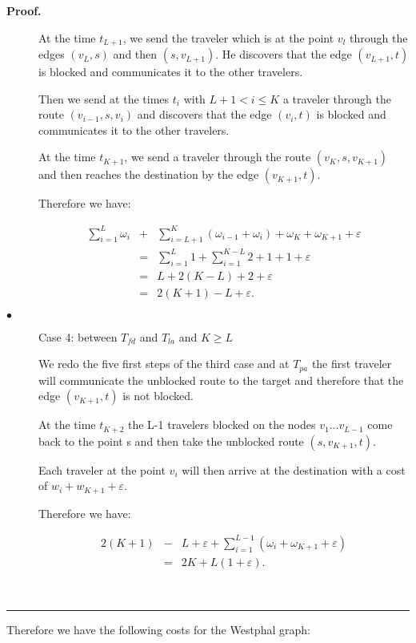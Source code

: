 \documentclass[a4paper, 10pt]{article}
\newenvironment{proof}[1][Proof]{\textbf{#1.} }{\ \rule{0.5em}{0.5em}}
\begin{document}
\begin{proof}
\begin{description}
At the time $t_{L+1}$, we send the traveler which is at the point $v_l$ through the edges $(v_{L},s)$ and then $(s,v_{L+1})$. He discovers that the edge $(v_{L+1},t)$ is blocked and communicates it to the other travelers.

Then we send at the times $t_i$ with $L+1 < i \leq K$ a traveler through the route $(v_{i-1},s,v_i)$ and discovers that the edge $(v_i,t)$ is blocked and communicates it to the other travelers.

At the time $t_{K+1}$, we send a traveler through the route $(v_K,s,v_{K+1})$ and then reaches the destination by the edge $(v_{K+1},t)$. 

Therefore we have: 

\begin{eqnarray}
\sum_{i=1}^{L} \omega_{i} &+& \sum_{i=L+1}^{K}(\omega_{i-1} + \omega_{i} ) + \omega_{K} + \omega_{K+1} + \varepsilon  \nonumber\\
&=&\sum_{i=1}^{L} 1 + \sum_{i=1}^{K-L}2 + 1 + 1 + \varepsilon\nonumber \\
&=& L + 2(K - L) + 2 + \varepsilon \nonumber\\
&=& 2(K + 1 ) - L + \varepsilon.\nonumber
\end{eqnarray}

\item[$\bullet$] Case 4: between $T_{fd}$ and $T_{la}$ and $K \geq L$

We redo the five first steps of the third case and at $ T_{pa}$ the first traveler will communicate the unblocked route to the target and therefore that the edge $(v_{K+1},t)$ is not blocked.

At the time $t_{K+2}$ the L-1 travelers blocked on the nodes $v_{1} ... v_{L-1} $ come back to the point s and then take the unblocked route $(s,v_{K+1},t)$.

Each traveler at the point $v_i$ will then arrive at the destination with a cost of $w_i + w_{K+1} + \varepsilon$. 

Therefore we have:

\begin{eqnarray}
2(K + 1) & - & L + \varepsilon + \sum_{i=1}^{L-1}(\omega_{i} + \omega_{K+1} + \varepsilon ) \nonumber\\
& = & 2K + L(1+\varepsilon).\nonumber
\end{eqnarray}


\end{description}
\end{proof}

Therefore we have the following costs for the Westphal graph:
\end{document}
